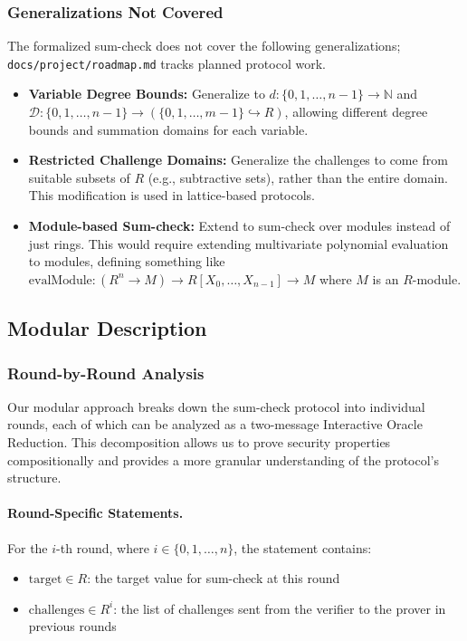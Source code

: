\subsubsection{Generalizations Not Covered}

The formalized sum-check does not cover the following generalizations; \texttt{docs/project/roadmap.md} tracks
planned protocol work.

\begin{itemize}
    \item \textbf{Variable Degree Bounds:} Generalize to $d : \{0, 1, \ldots, n-1\} \to \mathbb{N}$ and $\mathcal{D} : \{0, 1, \ldots, n-1\} \to (\{0, 1, \ldots, m-1\} \hookrightarrow R)$, allowing different degree bounds and summation domains for each variable.

    \item \textbf{Restricted Challenge Domains:} Generalize the challenges to come from suitable subsets of $R$ (e.g., subtractive sets), rather than the entire domain. This modification is used in lattice-based protocols.

    \item \textbf{Module-based Sum-check:} Extend to sum-check over modules instead of just rings. This would require extending multivariate polynomial evaluation to modules, defining something like $\text{evalModule} : (R^n \to M) \to R[X_0, \ldots, X_{n-1}] \to M$ where $M$ is an $R$-module.
\end{itemize}

\subsection{Modular Description}\label{sec:sumcheck_modular}

\subsubsection{Round-by-Round Analysis}

Our modular approach breaks down the sum-check protocol into individual rounds, each of which can be analyzed as a two-message Interactive Oracle Reduction. This decomposition allows us to prove security properties compositionally and provides a more granular understanding of the protocol's structure.

\paragraph{Round-Specific Statements.} For the $i$-th round, where $i \in \{0, 1, \ldots, n\}$, the statement contains:
\begin{itemize}
    \item $\text{target} \in R$: the target value for sum-check at this round
    \item $\text{challenges} \in R^i$: the list of challenges sent from the verifier to the prover in previous rounds
\end{itemize}

